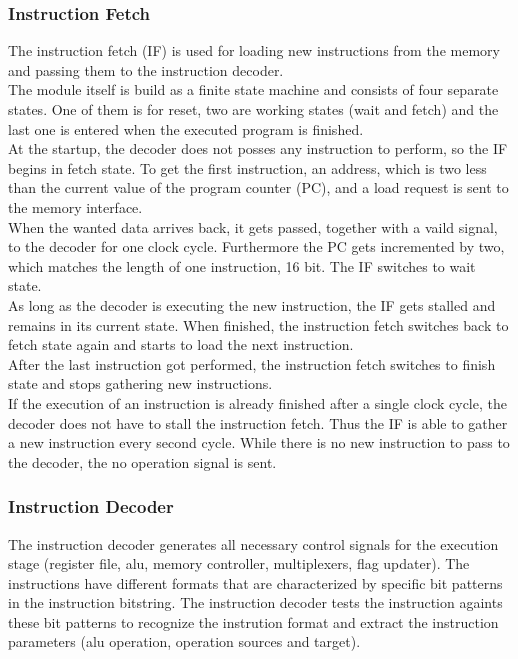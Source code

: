 \subsubsection{Instruction Fetch}
\label{subsubsec:instructionfetch}
The instruction fetch (IF) is used for loading new instructions from the memory and passing them to the instruction decoder.\\
The module itself is build as a finite state machine and consists of four separate states. One of them is for reset, two are working states (wait and fetch) and the last one is entered when the executed program is finished.\\
\newline
At the startup, the decoder does not posses any instruction to perform, so the IF begins in fetch state. To get the first instruction, an address, which is two less than the current value of the program counter (PC), and a load request is sent to the memory interface.\\
When the wanted data arrives back, it gets passed, together with a vaild signal, to the decoder for one clock cycle. Furthermore the PC gets incremented by two, which matches the length of one instruction, 16 bit. The IF switches to wait state.\\
As long as the decoder is executing the new instruction, the IF gets stalled and remains in its current state. When finished, the instruction fetch switches back to fetch state again and starts to load the next instruction.\\
After the last instruction got performed, the instruction fetch switches to finish state and stops gathering new instructions.\\
\newline
If the execution of an instruction is already finished after a single clock cycle, the decoder does not have to stall the instruction fetch. Thus the IF is able to gather a new instruction every second cycle. While there is no new instruction to pass to the decoder, the no operation signal is sent.

\subsubsection{Instruction Decoder}
\label{subsubsec:instructiondecoder}
The instruction decoder generates all necessary control signals for the execution stage (register file, alu, memory controller, multiplexers, flag updater). The instructions have different formats that are characterized by specific bit patterns in the instruction bitstring. The instruction decoder tests the instruction againts these bit patterns to recognize the instrution format and extract the instruction parameters (alu operation, operation sources and target).

